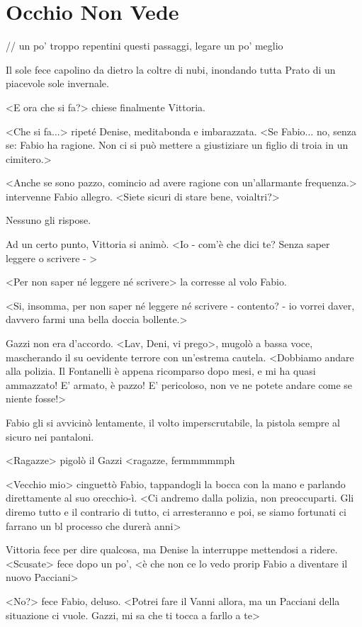 \chapter{Occhio Non Vede}

// un po' troppo repentini questi passaggi, legare un po' meglio

Il sole fece capolino da dietro la coltre di nubi, inondando tutta Prato di un piacevole sole invernale.

<E ora che si fa?> chiese finalmente Vittoria.

<Che si fa...> ripeté Denise, meditabonda e imbarazzata. <Se Fabio... no, senza se: Fabio ha ragione. Non ci si può mettere a giustiziare un figlio di troia in un cimitero.>

<Anche se sono pazzo, comincio ad avere ragione con un'allarmante frequenza.> intervenne Fabio allegro. <Siete sicuri di stare bene, voialtri?>

Nessuno gli rispose.

Ad un certo punto, Vittoria si animò. <Io - com'è che dici te? Senza saper leggere o scrivere - >

<Per non saper né leggere né scrivere> la corresse al volo Fabio.

<Si, insomma, per non saper né leggere né scrivere - contento? - io vorrei daver, davvero farmi una bella doccia bollente.>

Gazzi non era d'accordo. <Lav, Deni, vi prego>, mugolò a bassa voce, mascherando il su oevidente terrore con un'estrema cautela. <Dobbiamo andare alla polizia. Il Fontanelli è appena ricomparso dopo mesi, e mi ha quasi ammazzato! E' armato, è pazzo! E' pericoloso, non ve ne potete andare come se niente fosse!>

Fabio gli si avvicinò lentamente, il volto imperscrutabile, la pistola sempre al sicuro nei pantaloni. 

<Ragazze> pigolò il Gazzi <ragazze, fermmmmmph

<Vecchio mio> cinguettò Fabio, tappandogli la bocca con la mano e parlando direttamente al suo orecchio-ì. <Ci andremo dalla polizia, non preoccuparti. Gli diremo tutto e il contrario di tutto, ci arresteranno e poi, se siamo fortunati ci farrano un bl processo che durerà anni>

Vittoria fece per dire qualcosa, ma Denise la interruppe mettendosi a ridere. <Scusate> fece dopo un po', <è che non ce lo vedo prorip Fabio a diventare il nuovo Pacciani>

<No?> fece Fabio, deluso. <Potrei fare il Vanni allora, ma un  Pacciani della situazione ci vuole. Gazzi, mi sa che ti tocca a farllo a te>

